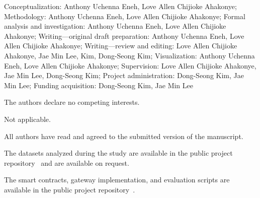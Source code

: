 \documentclass[pdflatex,sn-mathphys-num]{sn-jnl}
\begin{document}
{Conceptualization:} Anthony Uchenna Eneh, Love Allen Chijioke Ahakonye; {Methodology:} Anthony Uchenna Eneh, Love Allen Chijioke Ahakonye; {Formal analysis and investigation:} Anthony Uchenna Eneh, Love Allen Chijioke Ahakonye; {Writing—original draft preparation:} Anthony Uchenna Eneh, Love Allen Chijioke Ahakonye; {Writing—review and editing:}  Love Allen Chijioke Ahakonye, Jae Min Lee, Kim, Dong-Seong Kim; {Visualization:} Anthony Uchenna Eneh, Love Allen Chijioke Ahakonye; {Supervision:} Love Allen Chijioke Ahakonye, Jae Min Lee, Dong-Seong Kim; {Project administration:} Dong-Seong Kim, Jae Min Lee; {Funding acquisition:} Dong-Seong Kim, Jae Min Lee

The authors declare no competing interests.

Not applicable.

All authors have read and agreed to the submitted version of the manuscript.


The datasets analyzed during the study are available in the public project repository~\cite{pace-repo} and are available on request.


The smart contracts, gateway implementation, and evaluation scripts are available in the public project repository~\cite{pace-repo}.


\end{document}
